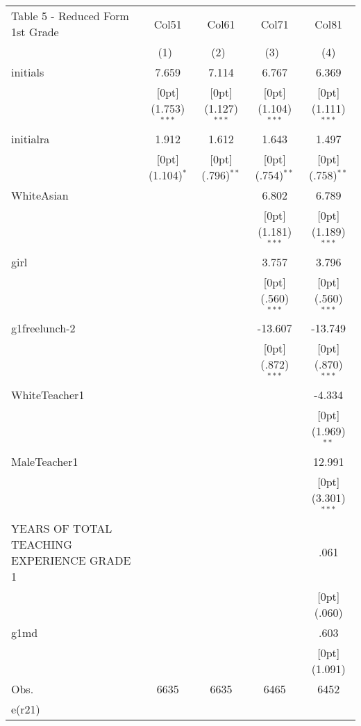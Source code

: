 \documentclass[a4paper,11pt]{article}
\begin{document}
\begin{table}
	\small
\begin{tabular*}{\textwidth}{@{\extracolsep{\fill}}lcccc}				
Table 5 - Reduced Form 1st Grade	& \multicolumn{1}{c}{Col51} &	\multicolumn{1}{c}{Col61} &	\multicolumn{1}{c}{Col71} &	\multicolumn{1}{c}{Col81} \\
	\cline{2-5}				
	& \multicolumn{1}{c}{(1)\mbox{\ }} &	\multicolumn{1}{c}{(2)\mbox{\ }} &	\multicolumn{1}{c}{(3)\mbox{\ }} &	\multicolumn{1}{c}{(4)} \\
	\hline				
	initials &	7.659 &	7.114 &	6.767 &	6.369 \\
	&	\raisebox{.7ex}[0pt]{\scriptsize (1.753)$^{***}$} &	\raisebox{.7ex}[0pt]{\scriptsize (1.127)$^{***}$} &	\raisebox{.7ex}[0pt]{\scriptsize (1.104)$^{***}$} &	\raisebox{.7ex}[0pt]{\scriptsize (1.111)$^{***}$} \\
	initialra &	1.912 &	1.612 &	1.643 &	1.497 \\
	&	\raisebox{.7ex}[0pt]{\scriptsize (1.104)$^{*}$} &	\raisebox{.7ex}[0pt]{\scriptsize (.796)$^{**}$} &	\raisebox{.7ex}[0pt]{\scriptsize (.754)$^{**}$} &	\raisebox{.7ex}[0pt]{\scriptsize (.758)$^{**}$} \\
	WhiteAsian &	&	&	6.802 &	6.789 \\
	&	&	&	\raisebox{.7ex}[0pt]{\scriptsize (1.181)$^{***}$} &	\raisebox{.7ex}[0pt]{\scriptsize (1.189)$^{***}$} \\
	girl &	&	&	3.757 &	3.796 \\
	&	&	&	\raisebox{.7ex}[0pt]{\scriptsize (.560)$^{***}$} &	\raisebox{.7ex}[0pt]{\scriptsize (.560)$^{***}$} \\
	g1freelunch-2 &	&	&	-13.607 &	-13.749 \\
	&	&	&	\raisebox{.7ex}[0pt]{\scriptsize (.872)$^{***}$} &	\raisebox{.7ex}[0pt]{\scriptsize (.870)$^{***}$} \\
	WhiteTeacher1 &	&	&	&	-4.334 \\
	&	&	&	&	\raisebox{.7ex}[0pt]{\scriptsize (1.969)$^{**}$} \\
	MaleTeacher1 &	&	&	&	12.991 \\
	&	&	&	&	\raisebox{.7ex}[0pt]{\scriptsize (3.301)$^{***}$} \\
	YEARS OF TOTAL TEACHING EXPERIENCE GRADE 1 &	&	&	&	.061 \\
	&	&	&	&	\raisebox{.7ex}[0pt]{\scriptsize (.060)} \\
	g1md &	&	&	&	.603 \\
	&	&	&	&	\raisebox{.7ex}[0pt]{\scriptsize (1.091)} \\
	Obs. &	6635 &	6635 &	6465 &	6452 \\
	e(r21) &	&	&	&	\\
	\hline\hline				
\end{tabular*}	
\end{table}	
\end{document}
